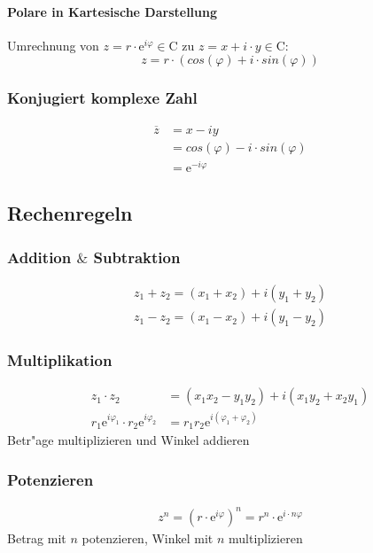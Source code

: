 \documentclass[10pt,a4paper,landscape]{article}
\begin{document}
\begin{multicols*}{3}
		\paragraph{Polare in Kartesische Darstellung}
		Umrechnung von $z =  r \cdot \mathrm{e}^{i\varphi} \in \mathrm{C}$ zu $z = x + i \cdot y \in \mathrm{C}$:
		\[ z = r \cdot (cos(\varphi) + i \cdot sin(\varphi))\]
		\subsubsection{Konjugiert komplexe Zahl}
		\begin{align*}
		\overline{z} & = x - iy                              \\
		& = cos(\varphi) - i \cdot sin(\varphi) \\
		& = \mathrm{e}^{-i\varphi}              
		\end{align*}
		\subsection{Rechenregeln}
		\subsubsection{Addition $\&$ Subtraktion}
		\begin{align*}
		z_1 + z_2 = (x_1 + x_2) + i (y_1 +y_2) \\
		z_1 - z_2 = (x_1 - x_2) + i (y_1 -y_2) 
		\end{align*}
		\subsubsection{Multiplikation}
		\begin{align*}
		z_1 \cdot z_2                                               & = (x_1x_2 - y_1y_2) + i (x_1y_2 + x_2y_1)     \\
		r_1\mathrm{e}^{i\varphi_1} \cdot r_2\mathrm{e}^{i\varphi_2} & = r_1r_2\mathrm{e}^{i(\varphi_1 + \varphi_2)} 
		\end{align*}
		Betr"age multiplizieren und Winkel addieren
		\subsubsection{Potenzieren}
		\begin{align*}
		z^n = (r \cdot \mathrm{e}^{i\varphi})^n =  r^n \cdot \mathrm{e}^{i \cdot n\varphi} 
		\end{align*}
		Betrag mit $n$ potenzieren, Winkel mit $n$ multiplizieren

\end{multicols*}
\end{document}
